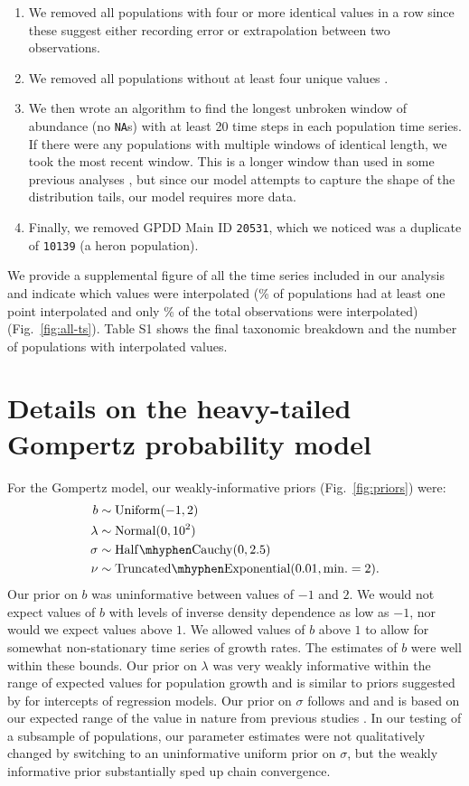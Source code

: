 \begin{enumerate}
\item
  We removed all populations with four or more identical values in a row since these suggest either recording error or extrapolation between two observations.
\item
  We removed all populations without at least four unique values \citep[following][]{brook2006a}.
\item
  We then wrote an algorithm to find the longest unbroken window of abundance (no \texttt{NA}s) with at least 20 time steps in each population time series. If there were any populations with multiple windows of identical length, we took the most recent window. This is a longer window than used in some previous analyses \citep[e.g.][]{brook2006a}, but since our model attempts to capture the shape of the distribution tails, our model requires more data.
\item
  Finally, we removed GPDD Main ID \texttt{20531}, which we noticed was a duplicate of \texttt{10139} (a heron population).
\end{enumerate}

We provide a supplemental figure of all the time series included in our analysis and indicate which values were interpolated (\percImputedPops\% of populations had at least one point interpolated and only \percImputedPoints\% of the total observations were interpolated) (Fig.~\ref{fig:all-ts}). Table S1 shows the final taxonomic breakdown and the number of populations with interpolated values.

\section{Details on the heavy-tailed Gompertz probability model}

For the Gompertz model, our weakly-informative priors (Fig.~\ref{fig:priors}) were: 
\begin{align*}
b &\sim \mathrm{Uniform}(-1, 2)\\
\lambda &\sim \mathrm{Normal}(0, 10^2)\\
\sigma &\sim \mathrm{Half\mhyphen Cauchy} (0, 2.5)\\
\nu &\sim \mathrm{Truncated\mhyphen Exponential}(0.01, \mathrm{min.} = 2). \end{align*}
Our prior on $b$ was uninformative between values of $-1$ and $2$. We would not expect values of $b$ with levels of inverse density dependence as low as $-1$, nor would we expect values above $1$. We allowed values of $b$ above $1$ to allow for somewhat non-stationary time series of growth rates. The estimates of $b$ were well within these bounds. Our prior on $\lambda$ was very weakly informative within the range of expected values for population growth and is similar to priors suggested by \citet{gelman2008d} for intercepts of regression models. Our prior on $\sigma$ follows \citet{gelman2006c} and \citet{gelman2008d} and is based on our expected range of the value in nature from previous studies \citep[e.g.][]{connors2014}. In our testing of a subsample of populations, our parameter estimates were not qualitatively changed by switching to an uninformative uniform prior on $\sigma$, but the weakly informative prior substantially sped up chain convergence.


